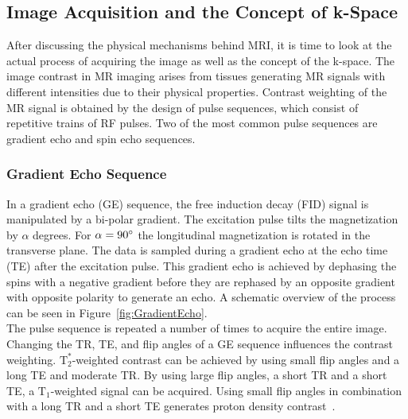 \subsection{Image Acquisition and the Concept of k-Space} \label{SubSec:ImageAcquisitionAndK-Space}
After discussing the physical mechanisms behind MRI, it is time to look at the actual process of acquiring the image as well as the concept of the k-space. 
The image contrast in MR imaging arises from tissues generating MR signals with different intensities due to their physical properties. Contrast weighting of the MR signal is obtained by the design of pulse sequences, which consist of repetitive trains of RF pulses. Two of the most common pulse sequences are gradient echo 
and spin echo 
sequences. %

\subsubsection{Gradient Echo Sequence}
In a gradient echo (GE) sequence, the free induction decay (FID) signal is manipulated by a bi-polar gradient. The excitation pulse tilts the magnetization by $\alpha$ degrees. For $\alpha = 90\degree$ the longitudinal magnetization is rotated in the transverse plane. The data is sampled during a gradient echo at the echo time (TE) after the excitation pulse. This gradient echo is achieved by dephasing the spins with a negative gradient before they are rephased by an opposite gradient with opposite polarity to generate an echo. A schematic overview of the process can be seen in Figure~\ref{fig:GradientEcho}. \\
The pulse sequence is repeated a number of times to acquire the entire image. 
Changing the TR, TE, and flip angles of a GE sequence influences the contrast weighting. $\text{T}^*_2$-weighted contrast can be achieved by using small flip angles and a long TE and moderate TR. By using large flip angles, a short TR and a short TE, a $\text{T}_1$-weighted signal can be acquired. Using small flip angles in combination with a long TR and a short TE generates proton density contrast~\cite{PulseSequences}.%

